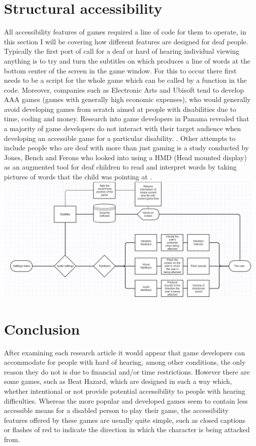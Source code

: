 \documentclass{scrartcl}
\begin{document}
\section{Structural accessibility}
All accessibility features of games required a line of code for them to operate, in this section I will be covering how different features are designed for deaf people.
Typically the first port of call for a deaf or hard of hearing individual viewing anything is to try and turn the subtitles on which produces a line of words at the bottom center of the screen in the game window. For this to occur there first needs to be a script for the whole game which can be called by a function in the code. Moreover, companies such as Electronic Arts and Ubisoft tend to develop AAA games (games with generally high economic expenses), who would generally avoid developing games from scratch aimed at people with disabilities due to time, coding and money. Research into game developers in Panama revealed that a majority of game developers do not interact with their target audience when developing an accessible game for a particular disability. \cite {moreno}. Other attempts to include people who are deaf with more than just gaming is a study conducted by Jones, Bench and Ferons who looked into using a HMD (Head mounted display) as an augmented tool for deaf children to read and interpret words by taking pictures of words that the child was pointing at \cite {Jones}.
\includegraphics [scale=0.5]{gliffy}

\section{Conclusion}
After examining each research article it would appear that game developers can accommodate for people with hard of hearing, among other conditions, the only reason they do not is due to
financial and/or time restrictions. However there are some games, such as Beat Hazard, which are designed in such a way which, whether intentional or not provide potential accessibility to people with hearing difficulties. Whereas the more popular and developed games seem to contain less accessible means for a disabled person to play their game, the accessibility features offered by these games are usually quite simple, such as closed captions or flashes of red to indicate the direction in which the character is being attacked from.



\end{document}
